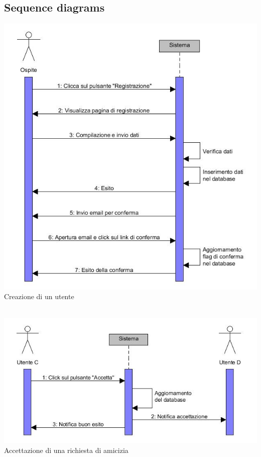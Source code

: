 \documentclass[a4paper,12pt]{article}
\begin{document}
\subsection{Sequence diagrams}
\begin{center}
\includegraphics[scale=0.6]{sDiagrams/creazioneUtente.jpg} \\
\caption{Creazione di un utente} \\
\vspace*{\fill}
\includegraphics[scale=0.6]{sDiagrams/accettazioneAmicizia.jpg} \\
\caption{Accettazione di una richiesta di amicizia} \\
\clearpage

\end{center}
\end{document}
